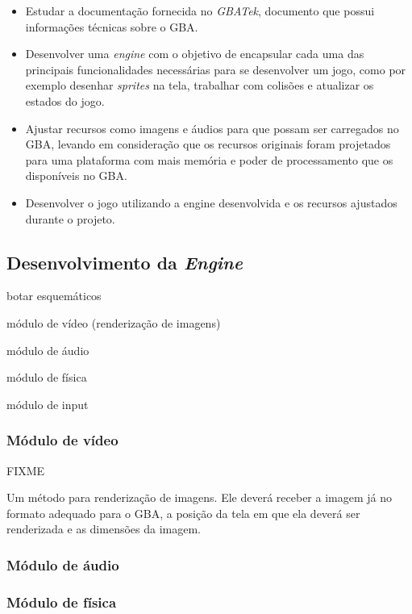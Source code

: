   \begin{itemize}
    \item Estudar a documentação fornecida no \textit{GBATek}, documento que possui informações técnicas sobre o GBA.

    \item Desenvolver uma \textit{engine} com o objetivo de encapsular cada uma das principais funcionalidades necessárias para se desenvolver um jogo, como por exemplo desenhar \textit{sprites} na tela, trabalhar com colisões e atualizar os estados do jogo.

    \item Ajustar recursos como imagens e áudios para que possam ser carregados no GBA, levando em consideração que os recursos originais foram projetados para uma plataforma com mais memória e poder de processamento que os disponíveis no GBA.

    \item Desenvolver o jogo utilizando a engine desenvolvida e os recursos ajustados durante o projeto.
  \end{itemize}

  \subsection{Desenvolvimento da \textit{Engine}}

  botar esquemáticos

  módulo de vídeo (renderização de imagens)

  módulo de áudio

  módulo de física

  módulo de input

  \subsubsection{Módulo de vídeo}
    FIXME

    Um método para renderização de imagens. Ele deverá receber a imagem já no formato adequado para o GBA, a posição da tela em que ela deverá ser renderizada e as dimensões da imagem.

  \subsubsection{Módulo de áudio}

  \subsubsection{Módulo de física}

